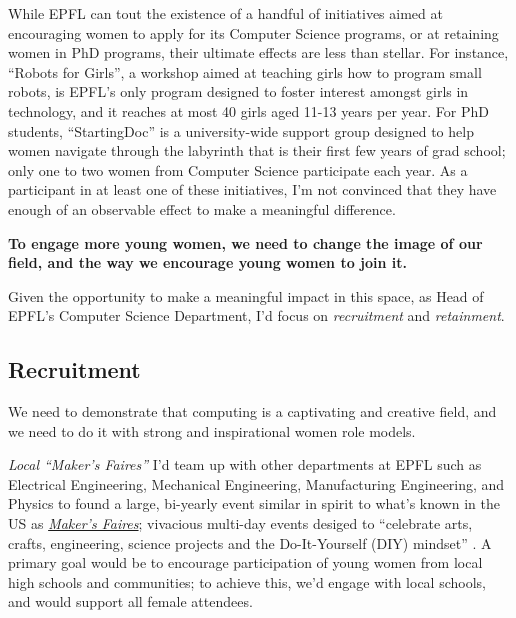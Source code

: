 \documentclass[acmtocl]{acmtrans2m}
\begin{document}
While EPFL can tout the existence of a handful of initiatives aimed at
encouraging women to apply for its Computer Science programs, or at retaining
women in PhD programs, their ultimate effects are less than stellar. For
instance, ``Robots for Girls'', a workshop aimed at teaching girls how to
program small robots, is EPFL's only program designed to foster interest
amongst girls in technology,
and it reaches at most 40 girls aged 11-13 years per year.
For PhD students, ``StartingDoc'' is a university-wide support group designed
to help women navigate through the labyrinth that is their first few years of
grad school; only one to two women from Computer Science participate each year.
As a participant in at least one of these initiatives, I'm not convinced that
they have enough of an observable effect to make a meaningful difference.


\textbf{To engage more young women, we need to change the image of our field,
and the way we encourage young women to join it.}

Given the opportunity to make a meaningful impact in this space, as Head
of EPFL's Computer Science Department, I'd focus on \textit{recruitment} and
\textit{retainment}.

\vspace{-0.15in}
\subsection*{\textbf{Recruitment}}
\vspace{-0.1in}
We need to demonstrate that computing is a captivating and creative field, and
we need to do it with strong and inspirational women role models.

\textit{\textsf{Local ``Maker's Faires''}}\newline
I'd team up with other departments at EPFL such as Electrical Engineering,
Mechanical Engineering, Manufacturing Engineering, and Physics to found a
large, {bi-yearly} event similar in spirit to what's known in the US as
\href{http://news.cnet.com/8301-13772_3-9935358-52.html}{\textit{Maker's
Faires}}; vivacious multi-day events desiged to ``celebrate arts, crafts,
engineering, science projects and the Do-It-Yourself (DIY) mindset''
\cite{MakerFaire}. A primary goal would be to encourage participation of
young women from local high schools and communities; to achieve this, we'd
engage with local schools, and would support all female attendees.
\end{document}
